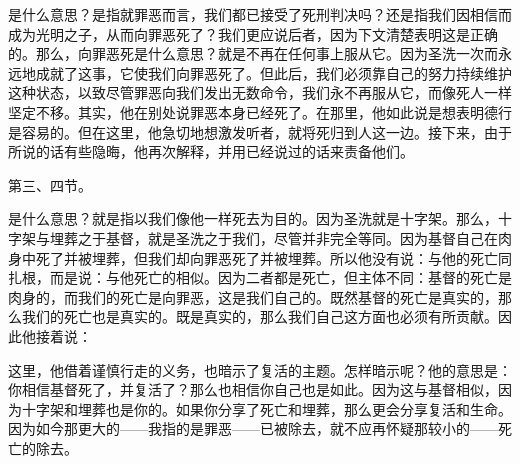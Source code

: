 是什么意思？是指就罪恶而言，我们都已接受了死刑判决吗？还是指我们因相信而成为光明之子，从而向罪恶死了？我们更应说后者，因为下文清楚表明这是正确的。那么，向罪恶死是什么意思？就是不再在任何事上服从它。因为圣洗一次而永远地成就了这事，它使我们向罪恶死了。但此后，我们必须靠自己的努力持续维护这种状态，以致尽管罪恶向我们发出无数命令，我们永不再服从它，而像死人一样坚定不移。其实，他在别处说罪恶本身已经死了。在那里，他如此说是想表明德行是容易的。但在这里，他急切地想激发听者，就将死归到人这一边。接下来，由于所说的话有些隐晦，他再次解释，并用已经说过的话来责备他们。\par

第三、四节。\par

是什么意思？就是指以我们像他一样死去为目的。因为圣洗就是十字架。那么，十字架与埋葬之于基督，就是圣洗之于我们，尽管并非完全等同。因为基督自己在肉身中死了并被埋葬，但我们却向罪恶死了并被埋葬。所以他没有说：与他的死亡同扎根，而是说：与他死亡的相似。因为二者都是死亡，但主体不同：基督的死亡是肉身的，而我们的死亡是向罪恶，这是我们自己的。既然基督的死亡是真实的，那么我们的死亡也是真实的。既是真实的，那么我们自己这方面也必须有所贡献。因此他接着说：\par

\par

这里，他借着谨慎行走的义务，也暗示了复活的主题。怎样暗示呢？他的意思是：你相信基督死了，并复活了？那么也相信你自己也是如此。因为这与基督相似，因为十字架和埋葬也是你的。如果你分享了死亡和埋葬，那么更会分享复活和生命。因为如今那更大的——我指的是罪恶——已被除去，就不应再怀疑那较小的——死亡的除去。\par

